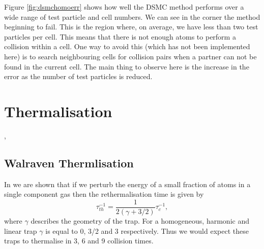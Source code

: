Figure \ref{fig:dsmchomoerr} shows how well the DSMC method performs over a wide range of test particle and cell numbers. 
We can see in the corner the method beginning to fail. 
This is the region where, on average, we have less than two test particles per cell. 
This means that there is not enough atoms to perform a collision within a cell. 
One way to avoid this (which has not been implemented here) is to search neighbouring cells for collision pairs when a partner can not be found in the current cell.
The main thing to observe here is the increase in the error as the number of test particles is reduced.



\section{Thermalisation}

\cite{Davis1995}, \cite{Anderlini2006}

\subsection{Walraven Thermlisation}
In \cite{Walraven2010} we are shown that if we perturb the energy of a small fraction of atoms in a single component gas then the rethermalisation time is given by
\begin{equation}
    \tau_{th}^{-1} = \frac{1}{2\left(\gamma + 3/2\right)} \tau_{c}^{-1},
\end{equation}
where $\gamma$ describes the geometry of the trap. For a homogeneous, harmonic and linear trap $\gamma$ is equal to 0, 3/2 and 3 respectively. Thus we would expect these traps to thermalise in 3, 6 and 9 collision times.

